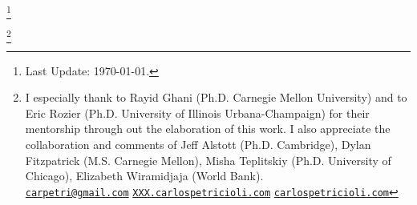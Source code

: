 \thispagestyle{plain}
\begin{center}
\scshape \large \thetitle\footnote{ Last Update: \today.}
\bigskip

\scshape \theauthor\footnote{I especially thank to Rayid Ghani (Ph.D. Carnegie Mellon University) and to Eric Rozier (Ph.D. University of Illinois Urbana-Champaign) for their mentorship through out the elaboration of this work. I also appreciate the collaboration and comments of Jeff Alstott (Ph.D. Cambridge), Dylan Fitzpatrick (M.S. Carnegie Mellon), Misha Teplitskiy (Ph.D. University of Chicago), Elizabeth Wiramidjaja (World Bank).
\\ \href{mailto:carpetri@gmail.com}{\texttt{carpetri@gmail.com}}  \hfill \href{http://XXX.carlospetricioli.com}{\texttt{XXX.carlospetricioli.com}} \hfill \href{http://carlospetricioli.com}{\texttt{carlospetricioli.com}} }
\normalsize
\end{center}

